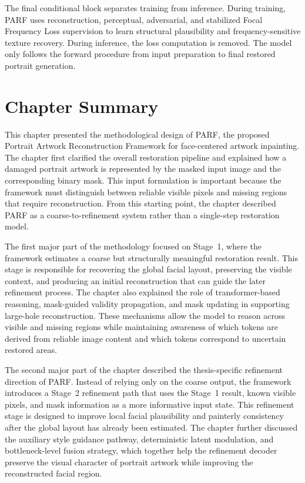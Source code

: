 \documentclass[12pt, twoside]{report}
\begin{document}
The final conditional block separates training from inference. During training, PARF uses reconstruction, perceptual, adversarial, and stabilized Focal Frequency Loss supervision to learn structural plausibility and frequency-sensitive texture recovery. During inference, the loss computation is removed. The model only follows the forward procedure from input preparation to final restored portrait generation.

\section{Chapter Summary}

This chapter presented the methodological design of PARF, the proposed Portrait Artwork Reconstruction Framework for face-centered artwork inpainting. The chapter first clarified the overall restoration pipeline and explained how a damaged portrait artwork is represented by the masked input image and the corresponding binary mask. This input formulation is important because the framework must distinguish between reliable visible pixels and missing regions that require reconstruction. From this starting point, the chapter described PARF as a coarse-to-refinement system rather than a single-step restoration model.

The first major part of the methodology focused on Stage~1, where the framework estimates a coarse but structurally meaningful restoration result. This stage is responsible for recovering the global facial layout, preserving the visible context, and producing an initial reconstruction that can guide the later refinement process. The chapter also explained the role of transformer-based reasoning, mask-guided validity propagation, and mask updating in supporting large-hole reconstruction. These mechanisms allow the model to reason across visible and missing regions while maintaining awareness of which tokens are derived from reliable image content and which tokens correspond to uncertain restored areas.

The second major part of the chapter described the thesis-specific refinement direction of PARF. Instead of relying only on the coarse output, the framework introduces a Stage~2 refinement path that uses the Stage~1 result, known visible pixels, and mask information as a more informative input state. This refinement stage is designed to improve local facial plausibility and painterly consistency after the global layout has already been estimated. The chapter further discussed the auxiliary style guidance pathway, deterministic latent modulation, and bottleneck-level fusion strategy, which together help the refinement decoder preserve the visual character of portrait artwork while improving the reconstructed facial region.
\end{document}

